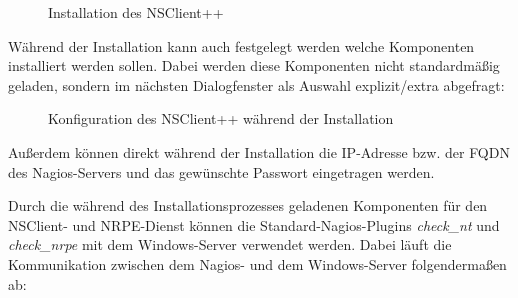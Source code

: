\begin{figure}[ht]
	\centering
		\caption{Installation des NSClient++}
		\label{nscs1}
\end{figure}

Während der Installation kann auch festgelegt werden welche Komponenten installiert werden sollen.
Dabei werden diese Komponenten nicht standardmäßig geladen, sondern im nächsten Dialogfenster als Auswahl explizit/extra abgefragt:

\begin{figure}[ht]
	\centering
		\caption{Konfiguration des NSClient++ während der Installation}
		\label{nscs2}
\end{figure}

Außerdem können direkt während der Installation die \gls{IP}-Adresse bzw. der \gls{FQDN} des Nagios-Servers und das gewünschte Passwort eingetragen werden.

Durch die während des Installationsprozesses geladenen Komponenten für den NSClient- und \gls{NRPE}-Dienst können die Standard-Nagios-Plugins \textit{check\_nt} und \textit{check\_nrpe} mit dem Windows-Server verwendet werden.
Dabei läuft die Kommunikation zwischen dem Nagios- und dem Windows-Server folgendermaßen ab:


